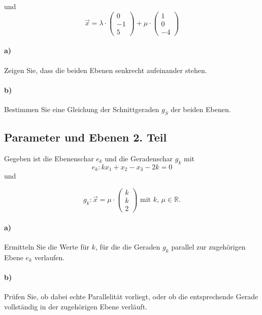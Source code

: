 \documentclass{ajc}
\numberwithin{equation}{subsection}
\begin{document}
	und
	\begin{equation}
		\overrightarrow{x}=\lambda \cdot \left(\begin{array}{r} 0 \\ -1 \\ 5\end{array}\right) + \mu \cdot \left(\begin{array}{r} 1 \\ 0 \\ -4\end{array}\right)
	\end{equation}
	
	\paragraph{a)} Zeigen Sie, dass die beiden Ebenen senkrecht aufeinander stehen.
	
	\paragraph{b)} Bestimmen Sie eine Gleichung der Schnittgeraden $g_S$ der beiden Ebenen.
	
	\subsection{Parameter und Ebenen 2. Teil}
	Gegeben ist die Ebenenschar $e_k$ und die Geradenschar $g_k$ mit
	\begin{equation}
		e_k: kx_1 + x_2 - x_3 - 2k = 0
	\end{equation}
	und 
	
	\begin{equation}
		g_k: \vec{x} = \mu \cdot \left(\begin{array}{r} k \\ k \\ 2\end{array}\right) \text{ mit } k,\,\mu \in \mathbb{R}.
	\end{equation}
	
	\paragraph{a)} Ermitteln Sie die Werte für $k$, für die die Geraden $g_k$ parallel zur zugehörigen Ebene $e_k$ verlaufen.
	
	\paragraph{b)} Prüfen Sie, ob dabei echte Parallelität vorliegt, oder ob die entsprechende Gerade vollständig in der zugehörigen Ebene verläuft. 
	
\end{document}
